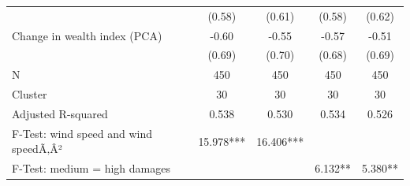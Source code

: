 {\begin{tabular}{l*{4}{c}}
                    &      (0.58)         &      (0.61)         &      (0.58)         &      (0.62)         \\
Change in wealth index (PCA)&       -0.60         &       -0.55         &       -0.57         &       -0.51         \\
                    &      (0.69)         &      (0.70)         &      (0.68)         &      (0.69)         \\
\midrule
N                   &         450         &         450         &         450         &         450         \\
Cluster             &          30         &          30         &          30         &          30         \\
Adjusted R-squared  &       0.538         &       0.530         &       0.534         &       0.526         \\
F-Test: wind speed and wind speedÃ‚Â²&   15.978***         &   16.406***         &                     &                     \\
F-Test: medium = high damages&                     &                     &     6.132**         &     5.380**         \\
\bottomrule
\end{tabular}
}
